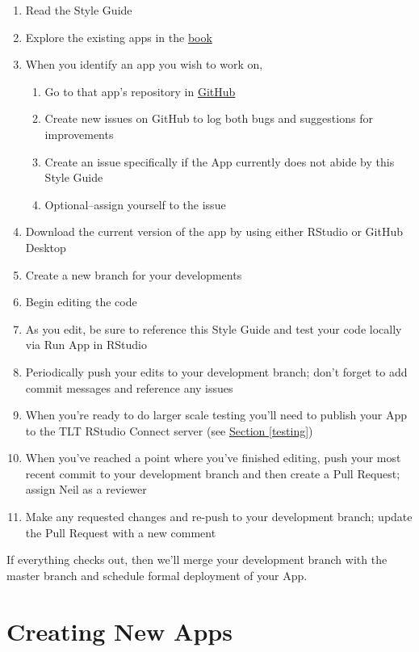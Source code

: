 \documentclass[
]{book}
\providecommand{\tightlist}{%
  \setlength{\itemsep}{0pt}\setlength{\parskip}{0pt}}
\begin{document}
\begin{enumerate}
\def\labelenumi{\arabic{enumi}.}
\tightlist
\item
  Read the Style Guide
\item
  Explore the existing apps in the \href{https://sites.psu.edu/shinyapps/}{book}
\item
  When you identify an app you wish to work on,

  \begin{enumerate}
  \def\labelenumii{\alph{enumii}.}
  \tightlist
  \item
    Go to that app's repository in \href{https://github.com/EducationShinyAppTeam}{GitHub}
  \item
    Create new issues on GitHub to log both bugs and suggestions for improvements
  \item
    Create an issue specifically if the App currently does not abide by this Style Guide
  \item
    Optional--assign yourself to the issue
  \end{enumerate}
\item
  Download the current version of the app by using either RStudio or GitHub Desktop
\item
  Create a new branch for your developments
\item
  Begin editing the code
\item
  As you edit, be sure to reference this Style Guide and test your code locally via Run App in RStudio
\item
  Periodically push your edits to your development branch; don't forget to add commit messages and reference any issues
\item
  When you're ready to do larger scale testing you'll need to publish your App to the TLT RStudio Connect server (see \protect\hyperlink{testing}{Section \ref{testing}})
\item
  When you've reached a point where you've finished editing, push your most recent commit to your development branch and then create a Pull Request; assign Neil as a reviewer
\item
  Make any requested changes and re-push to your development branch; update the Pull Request with a new comment
\end{enumerate}

If everything checks out, then we'll merge your development branch with the master branch and schedule formal deployment of your App.

\hypertarget{creating-new-apps}{%
\section{Creating New Apps}\label{creating-new-apps}}
\end{document}
